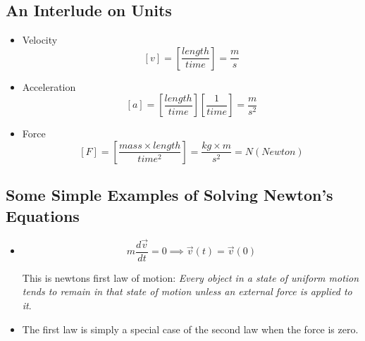 \documentclass[../main.tex]{subfiles}
\begin{document}
\subsection{An Interlude on Units}
\begin{itemize}
    \item Velocity
        \begin{equation}
            \left[v\right] = \left[\frac{length}{time}\right] = \frac{m}{s}
        \end{equation}

    \item Acceleration
        \begin{equation}
            \left[a\right] = \left[\frac{length}{time}\right]\left[\frac{1}{time}\right] = \frac{m}{s^2}
        \end{equation}

    \item Force
        \begin{equation}
            \left[F\right] = \left[\frac{mass \times length}{time^2}\right] = \frac{kg \times m}{s^2} = N (Newton)
        \end{equation}

\end{itemize}

\subsection{Some Simple Examples of Solving Newton's Equations}
\begin{itemize}
    \item 
        \begin{equation}
            m \frac{d\vec{v}}{dt} = 0 \implies \vec{v}(t) = \vec{v}(0)
        \end{equation}

        This is newtons first law of motion: \textit{ Every object in a state
        of uniform motion tends to remain in that state of motion unless an
        external force is applied to it}.
        
    \item The first law is simply a special case of the second law when the
        force is zero.

\end{itemize}
\end{document}
